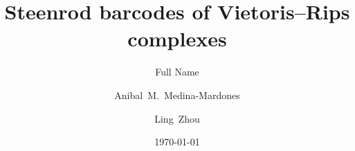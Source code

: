 \documentclass{amsart}
\title{Steenrod barcodes of Vietoris--Rips complexes}
\author[Last Name]{Full Name}
\author[Medina-Mardones]{Anibal~M.~Medina-Mardones}
\author[Zhou]{Ling~Zhou}
\date{\today}
\begin{document}
	
	\maketitle
	\tableofcontents
	
	
	
	
	
	
	\sloppy
	\printbibliography
%	
\end{document}
